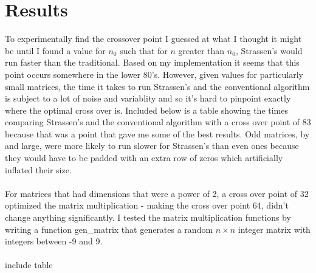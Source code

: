 \documentclass{article}
\begin{document}
\section{Results}
To experimentally find the crossover point I guessed at what I thought it might be until I found a value for $n_0$ such that for $n$ greater than $n_0$, Strassen's would run faster than the traditional.  Based on my implementation it seems that this point occurs somewhere in the lower 80's.  However, given values for particularly small matrices, the time it takes to run Strassen's and the conventional algorithm is subject to a lot of noise and variablity and so it's hard to pinpoint exactly where the optimal cross over is.  Included below is a table showing the times comparing Strassen's and the conventional algorithm with a cross over point of \huge{83} \normalsize because that was a point that gave me some of the best results.  Odd matrices, by and large, were more likely to run slower for Strassen's than even ones because they would have to be padded with an extra row of zeros which artificially inflated their size.  \\\\
\noindent
For matrices that had dimensions that were a power of 2, a cross over point of 32 optimized the matrix multiplication - making the cross over point 64, didn't change anything significantly. I tested the matrix multiplication functions by writing a function gen\_matrix that generates a random $n\times n$ integer matrix with integers between -9 and 9.  \\\\

\huge{include table} \normalsize \\
\end{document}
